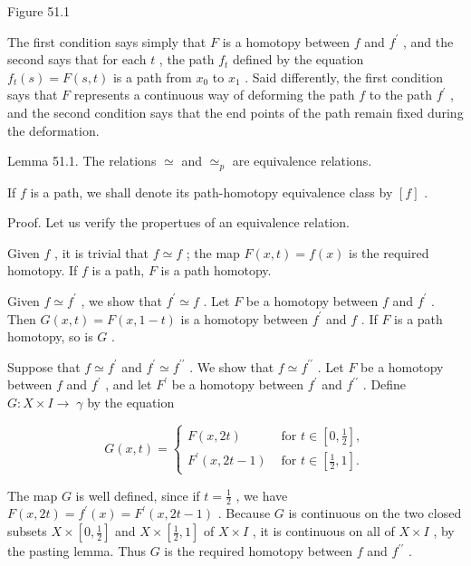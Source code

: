\documentclass[10pt]{article}
\begin{document}
Figure 51.1

The first condition says simply that \(F\) is a homotopy between \(f\) and \({f}^{\prime }\) , and the second says that for each \(t\) , the path \({f}_{t}\) defined by the equation \({f}_{t}\left( s\right)  = F\left( {s,t}\right)\) is a path from \({x}_{0}\) to \({x}_{1}\) . Said differently, the first condition says that \(F\) represents a continuous way of deforming the path \(f\) to the path \({f}^{\prime }\) , and the second condition says that the end points of the path remain fixed during the deformation.

Lemma 51.1. The relations \(\simeq\) and \({ \simeq  }_{p}\) are equivalence relations.

If \(f\) is a path, we shall denote its path-homotopy equivalence class by \(\left\lbrack  f\right\rbrack\) .

Proof. Let us verify the propertues of an equivalence relation.

Given \(f\) , it is trivial that \(f \simeq  f\) ; the map \(F\left( {x,t}\right)  = f\left( x\right)\) is the required homotopy. If \(f\) is a path, \(F\) is a path homotopy.

Given \(f \simeq  {f}^{\prime }\) , we show that \({f}^{\prime } \simeq  f\) . Let \(F\) be a homotopy between \(f\) and \({f}^{\prime }\) . Then \(G\left( {x,t}\right)  = F\left( {x,1 - t}\right)\) is a homotopy between \({f}^{\prime }\) and \(f\) . If \(F\) is a path homotopy, so is \(G\) .

Suppose that \(f \simeq  {f}^{\prime }\) and \({f}^{\prime } \simeq  {f}^{\prime \prime }\) . We show that \(f \simeq  {f}^{\prime \prime }\) . Let \(F\) be a homotopy between \(f\) and \({f}^{\prime }\) , and let \({F}^{\prime }\) be a homotopy between \({f}^{\prime }\) and \({f}^{\prime \prime }\) . Define \(G : X \times  I \rightarrow \; \gamma\) by the equation

\[
G\left( {x,t}\right)  = \left\{  \begin{array}{ll} F\left( {x,{2t}}\right) & \text{ for }t \in  \left\lbrack  {0,\frac{1}{2}}\right\rbrack  , \\  {F}^{\prime }\left( {x,{2t} - 1}\right) & \text{ for }t \in  \left\lbrack  {\frac{1}{2},1}\right\rbrack  . \end{array}\right.
\]

The map \(G\) is well defined, since if \(t = \frac{1}{2}\) , we have \(F\left( {x,{2t}}\right)  = {f}^{\prime }\left( x\right)  = {F}^{\prime }\left( {x,{2t} - 1}\right)\) . Because \(G\) is continuous on the two closed subsets \(X \times  \left\lbrack  {0,\frac{1}{2}}\right\rbrack\) and \(X \times  \left\lbrack  {\frac{1}{2},1}\right\rbrack\) of \(X \times  I\) , it is continuous on all of \(X \times  I\) , by the pasting lemma. Thus \(G\) is the required homotopy between \(f\) and \({f}^{\prime \prime }\) .
\end{document}
